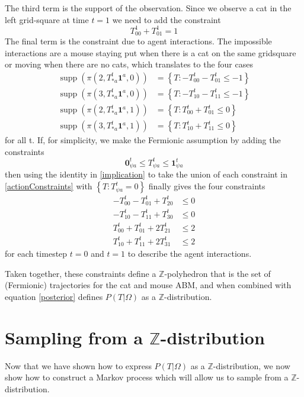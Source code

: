 \documentclass{article}
\DeclareMathOperator\supp{supp}
\begin{document}
The third term is the support of the observation. Since we observe a cat in the left grid-square at time $t=1$ we need to add the constraint
\[
T^1_{0 0} + T^1_{0 1} = 1
\]
The final term is the constraint due to agent interactions. The impossible interactions are a mouse staying put when there is a cat on the same gridsquare or moving when there are no cats, which translates to the four cases
\begin{equation}
\begin{aligned}
\supp(\pi(2,T^t_{* a}\mathbf{1}^a,0)) &= \left\{ T: -T^t_{0 0} - T^t_{0 1} \le -1 \right\}\\
\supp(\pi(3,T^t_{* a}\mathbf{1}^a,0)) &= \left\{ T: -T^t_{1 0} - T^t_{1 1} \le -1 \right\}\\
\supp(\pi(2,T^t_{* a}\mathbf{1}^a,1)) &= \left\{ T: T^t_{0 0} + T^t_{0 1} \le 0 \right\}\\
\supp(\pi(3,T^t_{* a}\mathbf{1}^a,1)) &= \left\{ T: T^t_{1 0} + T^t_{1 1} \le 0 \right\}
\end{aligned}
\label{actionConstraints}
\end{equation}
for all t. If, for simplicity, we make the Fermionic assumption by adding the constraints
\[
\mathbf{0}^t_{\psi a} \le T^t_{\psi a} \le \mathbf{1}^t_{\psi a}
\]
then using the identity in \eqref{implication} to take the union of each constraint in \eqref{actionConstraints} with $\left\{T: T^t_{\psi a} = 0\right\}$ finally gives the four constraints
\[
\begin{aligned}
-T^t_{0 0} - T^t_{0 1} + T^t_{2 0} & \le 0\\
-T^t_{1 0} - T^t_{1 1} + T^t_{3 0} & \le 0\\
T^t_{0 0} + T^t_{0 1} + 2T^t_{2 1} & \le 2 \\
T^t_{1 0} + T^t_{1 1} + 2T^t_{3 1} & \le 2
\end{aligned}
\]
for each timestep $t=0$ and $t=1$ to describe the agent interactions.

Taken together, these constraints define a $\mathbb{Z}$-polyhedron that is the set of (Fermionic) trajectories for the cat and mouse ABM, and when combined with equation \eqref{posterior} defines $P(T|\Omega)$ as a $\mathbb{Z}$-distribution.

\section{Sampling from a $\mathbb{Z}$-distribution}

Now that we have shown how to express $P(T|\Omega)$ as a $\mathbb{Z}$-distribution, we now show how to construct a Markov process which will allow us to sample from a $\mathbb{Z}$-distribution.
\end{document}
